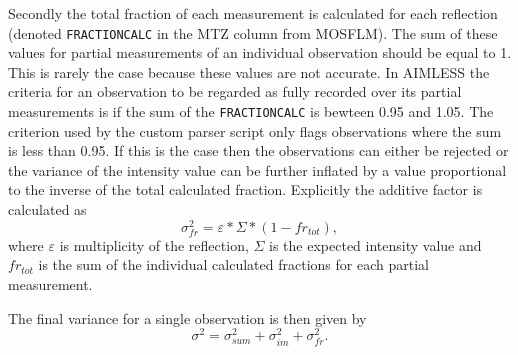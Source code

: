 Secondly the total fraction of each measurement is calculated for each reflection (denoted \verb+FRACTIONCALC+ in the MTZ column from MOSFLM).
The sum of these values for partial measurements of an individual observation should be equal to 1.
This is rarely the case because these values are not accurate.
In AIMLESS the criteria for an observation to be regarded as fully recorded over its partial measurements is if the sum of the \verb+FRACTIONCALC+ is bewteen 0.95 and 1.05.
The criterion used by the custom parser script only flags observations where the sum is less than 0.95.
If this is the case then the observations can either be rejected or the variance of the intensity value can be further inflated by a value proportional to the inverse of the total calculated fraction.
Explicitly the additive factor is calculated as
\begin{equation}
    \sigma^2_{fr} = \varepsilon * \Sigma * (1-fr_{tot}),
\end{equation}
where $\varepsilon$ is multiplicity of the reflection, $\Sigma$ is the expected intensity value and $fr_{tot}$ is the sum of the individual calculated fractions for each partial measurement.

The final variance for a single observation is then given by
\begin{equation}
    \sigma^2 = \sigma^2_{sum} + \sigma_{im}^2 + \sigma^2_{fr}.
\end{equation}
